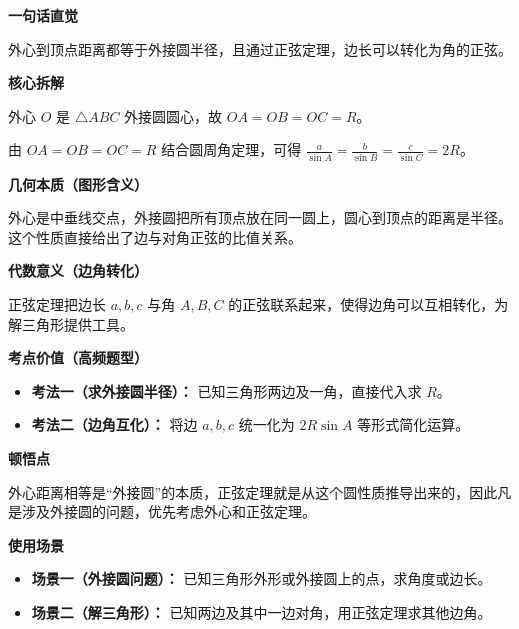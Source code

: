 \begin{explanationbox}
	\textbf{\textcolor{CExplanation}{一句话直觉}}

	外心到顶点距离都等于外接圆半径，且通过正弦定理，边长可以转化为角的正弦。

	\medskip
	\textbf{\textcolor{CExplanation}{核心拆解}}
	\begin{description}[style=nextline, leftmargin=2.8em, labelsep=0.5em, itemsep=0.45em]
		\item[\textbf{要点一（等距关系）：}] 外心 $O$ 是 $\triangle ABC$ 外接圆圆心，故 $OA = OB = OC = R$。
		\item[\textbf{要点二（正弦定理）：}] 由 $OA = OB = OC = R$ 结合圆周角定理，可得 $\frac{a}{\sin A} = \frac{b}{\sin B} = \frac{c}{\sin C} = 2R$。
	\end{description}

	\medskip
	\textbf{\textcolor{CExplanation}{几何本质（图形含义）}}

	外心是中垂线交点，外接圆把所有顶点放在同一圆上，圆心到顶点的距离是半径。这个性质直接给出了边与对角正弦的比值关系。

	\medskip
	\textbf{\textcolor{CExplanation}{代数意义（边角转化）}}

	正弦定理把边长 $a,b,c$ 与角 $A,B,C$ 的正弦联系起来，使得边角可以互相转化，为解三角形提供工具。

	\medskip
	\textbf{\textcolor{CExplanation}{考点价值（高频题型）}}
	\begin{itemize}[leftmargin=*, itemsep=0.5em, topsep=0.4em]
		\item \textbf{考法一（求外接圆半径）：} 已知三角形两边及一角，直接代入求 $R$。
		\item \textbf{考法二（边角互化）：} 将边 $a,b,c$ 统一化为 $2R\sin A$ 等形式简化运算。
	\end{itemize}

	\medskip
	\textbf{\textcolor{CExplanation}{顿悟点}}

	外心距离相等是“外接圆”的本质，正弦定理就是从这个圆性质推导出来的，因此凡是涉及外接圆的问题，优先考虑外心和正弦定理。

	\medskip
	\textbf{\textcolor{CExplanation}{使用场景}}
	\begin{itemize}[leftmargin=*, itemsep=0.5em, topsep=0.4em]
		\item \textbf{场景一（外接圆问题）：} 已知三角形外形或外接圆上的点，求角度或边长。
		\item \textbf{场景二（解三角形）：} 已知两边及其中一边对角，用正弦定理求其他边角。
	\end{itemize}
\end{explanationbox}
